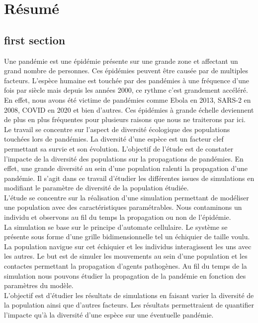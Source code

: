 \chapter{Résumé} \label{ch:intro}



\section{first section}
Une pandémie est une épidémie présente sur une grande zone et affectant un grand nombre de personnes. Ces épidémies peuvent être causée par de multiples facteurs. L'espèce humaine est touchée par des pandémies à une fréquence d'une fois par siècle mais depuis les années 2000, ce rythme c'est grandement accéléré. En effet, nous avons été victime de pandémies comme Ebola en 2013, SARS-2 en 2008, COVID en 2020 et bien d'autres. Ces épidémies à grande échelle deviennent de plus en plus fréquentes pour plusieurs raisons que nous ne traiterons par ici.\\

Le travail se concentre sur l'aspect de diversité écologique des populations touchées lors de pandémies. La diversité d'une espèce est un facteur clef permettant sa survie et son évolution. L'objectif de l'étude est de constater l'impacte de la diversité des populations sur la propagations de pandémies. En effet, une grande diversité au sein d'une population ralenti la propagation d'une pandémie. Il s'agit dans ce travail d'étudier les différentes issues de simulations en modifiant le paramètre de diversité de la population étudiée.\\

L'étude se concentre sur la réalisation d'une simulation permettant de modéliser une population avec des caractéristiques paramétrables. Nous contaminons un individu et observons au fil du temps la propagation ou non de l'épidémie.\\

La simulation se base sur le principe d'automate cellulaire. Le système se présente sous forme d'une grille bidimensionnelle tel un échiquier de taille voulu. La population navigue sur cet échiquier et les individus interagissent les uns avec les autres. Le but est de simuler les mouvements au sein d'une population et les contactes permettant la propagation d'agents pathogènes. Au fil du temps de la simulation nous pouvons étudier la propagation de la pandémie en fonction des paramètres du modèle.\\

L'objectif est d'étudier les résultats de simulations en faisant varier la diversité de la population ainsi que d'autres facteurs. Les résultats permettraient de quantifier l'impacte qu'à la diversité d'une espèce sur une éventuelle pandémie.
